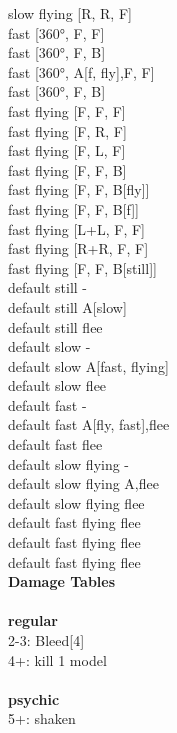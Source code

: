 slow flying [R, R, F] \\
fast [360°, F, F] \\
fast [360°, F, B] \\
fast [360°, A[f, fly],F, F] \\
fast [360°, F, B] \\
fast flying [F, F, F] \\
fast flying [F, R, F] \\
fast flying [F, L, F] \\
fast flying [F, F, B] \\
fast flying [F, F, B[fly]] \\
fast flying [F, F, B[f]] \\
fast flying [L+L, F, F] \\
fast flying [R+R, F, F] \\
fast flying [F, F, B[still]] \\
default still - \\
default still A[slow] \\
default still flee \\
default slow - \\
default slow A[fast, flying] \\
default slow flee \\
default fast - \\
default fast A[fly, fast],flee \\
default fast flee \\
default slow flying - \\
default slow flying A,flee \\
default slow flying flee \\
default fast flying flee \\
default fast flying flee \\
default fast flying flee \\


{\bf Damage Tables} \\
\ \\ {\bf regular } \\
2-3: Bleed[4] \\
4+: kill 1 model \\
\ \\ {\bf psychic } \\
5+: shaken \\










